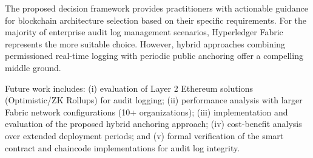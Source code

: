\documentclass[12pt,a4paper]{article}
\begin{document}
The proposed decision framework provides practitioners with actionable guidance for blockchain architecture selection based on their specific requirements. For the majority of enterprise audit log management scenarios, Hyperledger Fabric represents the more suitable choice. However, hybrid approaches combining permissioned real-time logging with periodic public anchoring offer a compelling middle ground.

Future work includes: (i) evaluation of Layer 2 Ethereum solutions (Optimistic/ZK Rollups) for audit logging; (ii) performance analysis with larger Fabric network configurations (10+ organizations); (iii) implementation and evaluation of the proposed hybrid anchoring approach; (iv) cost-benefit analysis over extended deployment periods; and (v) formal verification of the smart contract and chaincode implementations for audit log integrity.


\end{document}
